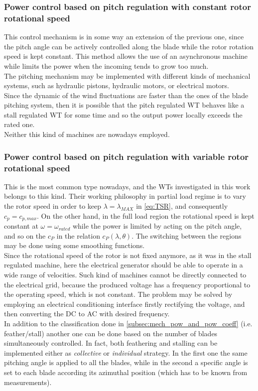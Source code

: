 \subsubsection{Power control based on pitch regulation with constant rotor rotational speed}
This control mechanism is in some way an extension of the previous one, since the pitch angle can be actively controlled along the blade while the rotor rotation speed is kept constant. This method allows the use of an asynchronous machine while limits the power when the incoming tends to grow too much. \\
 The pitching mechanism may be implemented with different kinds of mechanical systems, such as hydraulic pistons, hydraulic motors, or electrical motors. \\
Since the dynamic of the wind fluctuations are faster than the ones of the blade pitching system, then it is possible that the pitch regulated WT behaves like a stall regulated \acrshort{WT} for some time and so the output power locally exceeds the rated one.\\
Neither this kind of machines are nowadays employed.

\subsubsection{Power control based on pitch regulation with variable rotor rotational speed}
This is the most common type nowadays, and the \acrshort{WTs} investigated in this work belongs to this kind. Their working philosophy in partial load regime is to vary the rotor speed in order to keep $\lambda = \lambda_{MAX}$ in \autoref{eq:TSR}, and consequently $c_p=c_{p,max}$. On the other hand, in the full load region the rotational speed is kept constant at $\omega = \omega_{rated}$ while the power is limited by acting on the pitch angle, and so on the $c_P$ in the relation $c_P(\lambda, \theta)$. The switching between the regions may be done using some smoothing functions. \\
Since the rotational speed of the rotor is not fixed anymore, as it was in the stall regulated machine, here the electrical generator should be able to operate in a wide range of velocities. Such kind of machines cannot be directly connected to the electrical grid, because the produced voltage has a frequency proportional to the operating speed, which is not constant. The problem may be solved by employing an electrical conditioning interface firstly rectifying the voltage, and then converting the DC to AC with desired frequency. \\
In addition to the classification done in \ref{subsec:mech_pow_and_pow_coeff} (i.e. feather/stall) another one can be done based on the number of blades simultaneously controlled. In fact, both feathering and stalling can be implemented either as \textit{collective} or \textit{individual} strategy. In the first one the same pitching angle is applied to all the blades, while in the second a specific angle is set to each blade according its azimuthal position (which has to be known from measurements).

